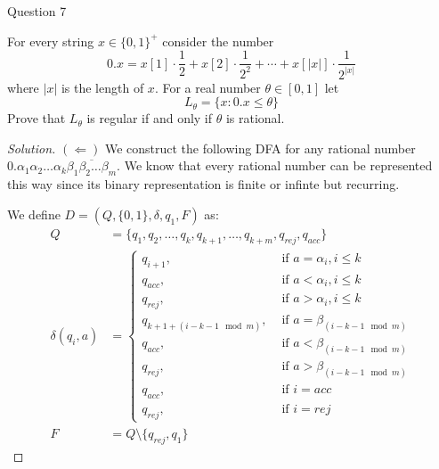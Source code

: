 \begin{solution}{Question 7}\label{ques:7}
    \begin{question}
      For every string $x\in \{0, 1\}^+$ consider the number
      \begin{equation*}
        0.x = x[1]\cdot\frac{1}{2} + x[2]\cdot\frac{1}{2^2} + \cdots + x[|x|]\cdot\frac{1}{2^{|x|}}
      \end{equation*}
      where $|x|$ is the length of $x$. For a real number $\theta\in [0, 1]$ let
      \begin{equation*}
        L_\theta = \{x: 0.x \leq \theta\}
      \end{equation*}
      Prove that $L_\theta$ is regular if and only if $\theta$ is rational.
    \end{question}
    \tcblower{}
    \begin{proof}[Solution]
      $(\Longleftarrow)$ We construct the following DFA for any rational number $0.\alpha_1\alpha_2\ldots\alpha_k\overline{\beta_1\beta_2\ldots\beta_m}$. We know that every rational number can be represented this way since its binary representation is finite or infinte but recurring.\par
      We define $D = (Q, \{0, 1\}, \delta, q_1, F)$ as:
      \begin{equation}
        \begin{split}
          Q &= \{q_1, q_2, \ldots, q_k, q_{k+1}, \ldots, q_{k+m}, q_{rej}, q_{acc}\}\\
          \delta(q_i, a) &=
          \begin{cases}
            q_{i+1}, &\text{ if }a = \alpha_i, i \leq k\\
            q_{acc}, &\text{ if }a < \alpha_i, i \leq k\\
            q_{rej}, &\text{ if }a > \alpha_i, i \leq k\\
            q_{k+1+(i-k-1\mod{m})}, &\text{ if }a = \beta_{(i-k-1\mod{m})}\\
            q_{acc}, &\text{ if }a < \beta_{(i-k-1\mod{m})}\\
            q_{rej}, &\text{ if }a > \beta_{(i-k-1\mod{m})}\\
            q_{acc}, &\text{ if }i = acc\\
            q_{rej}, &\text{ if }i = rej
          \end{cases}\\
          F &= Q \setminus \{q_{rej}, q_1\}
        \end{split}
      \end{equation}

\end{proof}
\end{solution}

